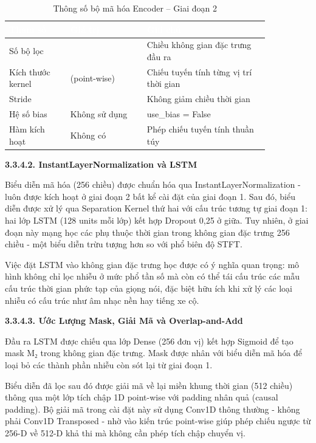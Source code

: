 \documentclass[
  13pt,
]{article}
\begin{document}
\begin{table}[htbp]
\centering
\caption{Thông số bộ mã hóa Encoder -- Giai đoạn 2}
\label{tab:encoder-params}
\begin{tabular}{>{\raggedright\arraybackslash}p{0.2\linewidth} >{\centering\arraybackslash}p{0.25\linewidth} >{\raggedright\arraybackslash}p{0.4\linewidth}}
\toprule
\rowcolor{headerblue} \textcolor{white}{\textbf{Tham số}} & \textcolor{white}{\textbf{Giá trị}} & \textcolor{white}{\textbf{Ghi chú}} \\
\midrule
\rowcolor{rowgray} Số bộ lọc & 256 & Chiều không gian đặc trưng đầu ra \\
Kích thước kernel & 1 (point-wise) & Chiếu tuyến tính từng vị trí thời gian \\
\rowcolor{rowgray} Stride & 1 & Không giảm chiều thời gian \\
Hệ số bias & Không sử dụng & use\_bias = False \\
\rowcolor{rowgray} Hàm kích hoạt & Không có & Phép chiếu tuyến tính thuần túy \\
\bottomrule
\end{tabular}
\end{table}

\textbf{3.3.4.2. InstantLayerNormalization và LSTM}

Biểu diễn mã hóa (256 chiều) được chuẩn hóa qua
InstantLayerNormalization - luôn được kích hoạt ở giai đoạn 2 bất kể cài
đặt của giai đoạn 1. Sau đó, biểu diễn được xử lý qua Separation Kernel
thứ hai với cấu trúc tương tự giai đoạn 1: hai lớp LSTM (128 units mỗi
lớp) kết hợp Dropout 0,25 ở giữa. Tuy nhiên, ở giai đoạn này mạng học
các phụ thuộc thời gian trong không gian đặc trưng 256 chiều - một biểu
diễn trừu tượng hơn so với phổ biên độ STFT.

Việc đặt LSTM vào không gian đặc trưng học được có ý nghĩa quan trọng:
mô hình không chỉ lọc nhiễu ở mức phổ tần số mà còn có thể tái cấu trúc
các mẫu cấu trúc thời gian phức tạp của giọng nói, đặc biệt hữu ích khi
xử lý các loại nhiễu có cấu trúc như âm nhạc nền hay tiếng xe cộ.

\textbf{3.3.4.3. Ước Lượng Mask, Giải Mã và Overlap-and-Add}

Đầu ra LSTM được chiếu qua lớp Dense (256 đơn vị) kết hợp Sigmoid để tạo
mask M₂ trong không gian đặc trưng. Mask được nhân với biểu diễn mã hóa
để loại bỏ các thành phần nhiễu còn sót lại từ giai đoạn 1.

Biểu diễn đã lọc sau đó được giải mã về lại miền khung thời gian (512
chiều) thông qua một lớp tích chập 1D point-wise với padding nhân quả
(causal padding). Bộ giải mã trong cài đặt này sử dụng Conv1D thông
thường - không phải Conv1D Transposed - nhờ vào kiến trúc point-wise
giúp phép chiếu ngược từ 256-D về 512-D khả thi mà không cần phép tích
chập chuyển vị.
\end{document}
